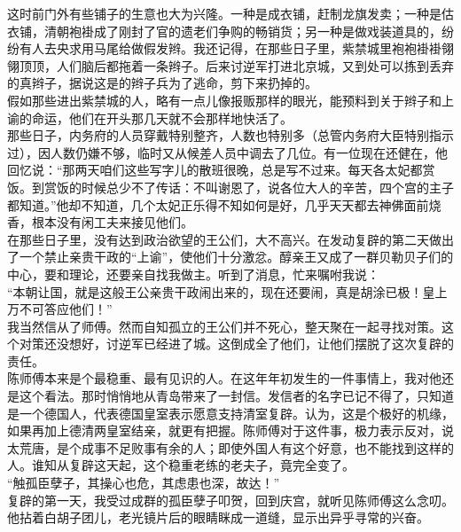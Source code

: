 这时前门外有些铺子的生意也大为兴隆。一种是成衣铺，赶制龙旗发卖；一种是估衣铺，清朝袍褂成了刚封了官的遗老们争购的畅销货；另一种是做戏装道具的，纷纷有人去央求用马尾给做假发辫。我还记得，在那些日子里，紫禁城里袍袍褂褂翎翎顶顶，人们脑后都拖着一条辫子。后来讨逆军打进北京城，又到处可以拣到丢弃的真辫子，据说这是的辫子兵为了逃命，剪下来扔掉的。\\

假如那些进出紫禁城的人，略有一点儿像报贩那样的眼光，能预料到关于辫子和上谕的命运，他们在开头那几天就不会那样地快活了。\\

那些日子，内务府的人员穿戴特别整齐，人数也特别多（总管内务府大臣特别指示过），因人数仍嫌不够，临时又从候差人员中调去了几位。有一位现在还健在，他回忆说：“那两天咱们这些写字儿的散班很晚，总是写不过来。每天各太妃都赏饭。到赏饭的时候总少不了传话：不叫谢恩了，说各位大人的辛苦，四个宫的主子都知道。”他却不知道，几个太妃正乐得不知如何是好，几乎天天都去神佛面前烧香，根本没有闲工夫来接见他们。\\

在那些日子里，没有达到政治欲望的王公们，大不高兴。在发动复辟的第二天做出了一个禁止亲贵干政的“上谕”，使他们十分激忿。醇亲王又成了一群贝勒贝子们的中心，要和理论，还要亲自找我做主。听到了消息，忙来嘱咐我说：\\

“本朝让国，就是这般王公亲贵干政闹出来的，现在还要闹，真是胡涂已极！皇上万不可答应他们！”\\

我当然信从了师傅。然而自知孤立的王公们并不死心，整天聚在一起寻找对策。这个对策还没想好，讨逆军已经进了城。这倒成全了他们，让他们摆脱了这次复辟的责任。\\

陈师傅本来是个最稳重、最有见识的人。在这年年初发生的一件事情上，我对他还是这个看法。那时悄悄地从青岛带来了一封信。发信者的名字已记不得了，只知道是一个德国人，代表德国皇室表示愿意支持清室复辟。认为，这是个极好的机缘，如果再加上德清两皇室结亲，就更有把握。陈师傅对于这件事，极力表示反对，说太荒唐，是个成事不足败事有余的人；即使外国人有这个好意，也不能找到这样的人。谁知从复辟这天起，这个稳重老练的老夫子，竟完全变了。\\

“触孤臣孽子，其操心也危，其虑患也深，故达！”\\

复辟的第一天，我受过成群的孤臣孽子叩贺，回到庆宫，就听见陈师傅这么念叨。他拈着白胡子团儿，老光镜片后的眼睛眯成一道缝，显示出异乎寻常的兴奋。\\

